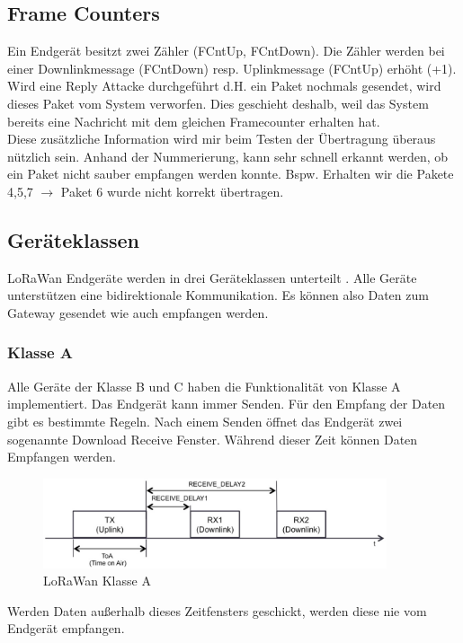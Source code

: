 \documentclass[11pt,english,german]{report}
\theoremstyle{definition}
\begin{document}
\subsection{Frame Counters}
Ein Endgerät besitzt zwei Zähler (FCntUp, FCntDown). Die Zähler werden bei einer Downlinkmessage (FCntDown) resp. Uplinkmessage (FCntUp) erhöht (+1).\\[0.3cm]
Wird eine Reply Attacke durchgeführt d.H. ein Paket nochmals gesendet, wird dieses Paket vom System verworfen. Dies geschieht deshalb, weil das System bereits eine Nachricht mit dem gleichen Framecounter erhalten hat.\\[0.3cm]
Diese zusätzliche Information wird mir beim Testen der Übertragung überaus nützlich sein. Anhand der Nummerierung, kann sehr schnell erkannt werden, ob ein Paket nicht sauber empfangen werden konnte. Bspw. Erhalten wir die Pakete 4,5,7 $\rightarrow$ Paket 6 wurde nicht korrekt übertragen.

\newpage
\subsection{Geräteklassen}
LoRaWan Endgeräte werden in drei Geräteklassen unterteilt \cite{lorawan_classes}. Alle Geräte unterstützen eine bidirektionale Kommunikation. Es können also Daten zum Gateway gesendet wie auch empfangen werden.
\subsubsection{Klasse A}
Alle Geräte der Klasse B und C haben die Funktionalität von Klasse A implementiert. Das Endgerät kann immer Senden. Für den Empfang der Daten gibt es bestimmte Regeln. Nach einem Senden öffnet das Endgerät zwei sogenannte Download Receive Fenster. Während dieser Zeit können Daten Empfangen werden. 

\begin{figure}[H]
	\centering
	\includegraphics[width=0.9\textwidth]{img/lorawan_class_a.png}
	\caption[LoRaWan Klasse A]
	{LoRaWan Klasse A}
\end{figure}
\noindent
Werden Daten außerhalb dieses Zeitfensters geschickt, werden diese nie vom Endgerät empfangen.
\end{document}
